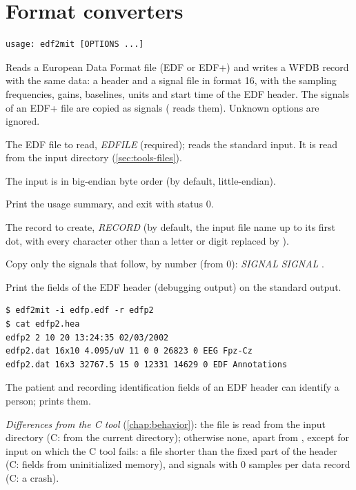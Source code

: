 \section{Format converters}
\label{sec:tools-converters}

\begin{lstlisting}[style=signature,language={}]
usage: edf2mit [OPTIONS ...]
\end{lstlisting}
Reads a European Data Format file (EDF or EDF+) and writes a WFDB record with the same
data: a header and a signal file in format 16, with the sampling frequencies, gains,
baselines, units and start time of the EDF header. The signals  of an
EDF+ file are copied as signals ( reads them). Unknown options are ignored.
\begin{params}
\item[-i] The EDF file to read, \textit{EDFILE} (required); \code{-} reads the standard
  input. It is read from the input directory (\cref{sec:tools-files}).
\item[-b] The input is in big-endian byte order (by default, little-endian).
\item[-h] Print the usage summary, and exit with status 0.
\item[-r] The record to create, \textit{RECORD} (by default, the input file name up to its
  first dot, with every character other than a letter or digit replaced by \code{\_}).
\item[-s] Copy only the signals that follow, by number (from 0):
   \textit{SIGNAL} \code{[}\textit{SIGNAL} \code{...]}.
\item[-v] Print the fields of the EDF header (debugging output) on the standard output.
\end{params}
\begin{lstlisting}[style=text]
$ edf2mit -i edfp.edf -r edfp2
$ cat edfp2.hea
edfp2 2 10 20 13:24:35 02/03/2002
edfp2.dat 16x10 4.095/uV 11 0 0 26823 0 EEG Fpz-Cz
edfp2.dat 16x3 32767.5 15 0 12331 14629 0 EDF Annotations
\end{lstlisting}
\begin{phibox}
The patient and recording identification fields of an EDF header can identify a person;
 prints them.
\end{phibox}
\textit{Differences from the C tool} (\cref{chap:behavior}): the  file is read from
the input directory (C: from the current directory); otherwise none, apart from
, except for input on which the C tool fails: a file shorter than the fixed
part of the header (C: fields from uninitialized memory), and signals with 0 samples per
data record (C: a crash).


